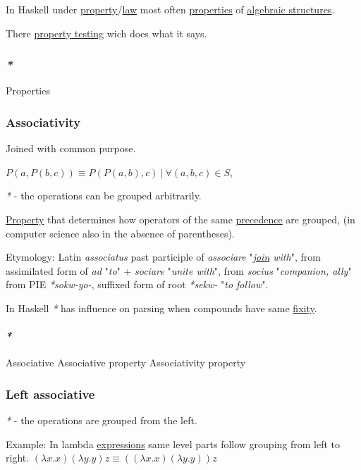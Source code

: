 \documentclass[a4paper,14pt,oneside]{book}
\begin{document}
In Haskell under \hyperref[org4e667e9]{property}/\hyperref[org6ee6401]{law} most often \hyperref[orgcc2a9e0]{properties} of \hyperref[org9144c3f]{algebraic structures}.

There \hyperref[orga5e0bbc]{property testing} wich does what it says.

\subsubsection{\emph{*}}
\label{sec:org5db5de1}

\label{orgcc2a9e0}Properties

\subsubsection{\label{org47978fc}Associativity}
\label{sec:org0afdb25}
Joined with common purpose.

\(P(a,P(b,c)) \equiv P(P(a,b),c) \ | \ \forall (a,b,c) \in S\),

\emph{*} - the operations can be grouped arbitrarily.

\hyperref[org4e667e9]{Property} that determines how operators of the same \hyperref[org65840b8]{precedence} are grouped, (in computer science also in the absence of parentheses).

Etymology:
Latin \emph{associatus} past participle of \emph{associare} "\emph{\hyperref[org0e7ba15]{join} with}", from assimilated form of \emph{ad} "\emph{to}" + \emph{sociare} "\emph{unite with}", from \emph{socius} "\emph{companion, ally}" from PIE \emph{*sokw-yo-}, suffixed form of root \emph{*sekw-} "\emph{to follow}".

In Haskell \emph{*} has influence on parsing when compounds have same \hyperref[org1aaff29]{fixity}.

\paragraph{\emph{*}}
\label{sec:orgc4bf8fe}

\label{org97d8b54}Associative
\label{orgb355b92}Associative property
\label{orgccd25a1}Associativity property

\subsubsection{\label{org684bfb4}Left associative}
\label{sec:orgd89dc9b}
\emph{*} - the operations are grouped from the left.

Example:
In lambda \hyperref[orga133a6d]{expressions} same level parts follow grouping from left to right.
\((\lambda x . x)(\lambda y . y)z \equiv ((\lambda x . x)(\lambda y . y))z\)
\end{document}

